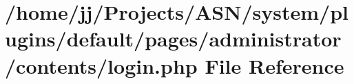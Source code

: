\hypertarget{system_2plugins_2default_2pages_2administrator_2contents_2login_8php}{}\section{/home/jj/\+Projects/\+A\+S\+N/system/plugins/default/pages/administrator/contents/login.php File Reference}
\label{system_2plugins_2default_2pages_2administrator_2contents_2login_8php}
